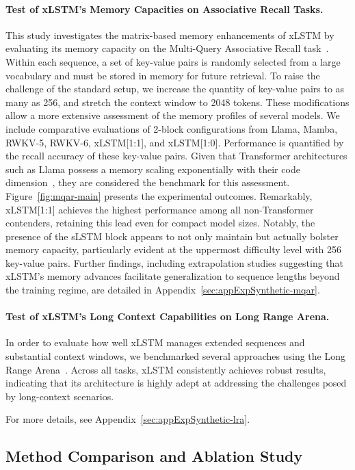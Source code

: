 \paragraph{Test of xLSTM's Memory Capacities on Associative Recall Tasks.} This study investigates the matrix-based memory enhancements of xLSTM by evaluating its memory capacity on the Multi-Query Associative Recall task~\citep{Arora:23arxiv}. Within each sequence, a set of key-value pairs is randomly selected from a large vocabulary and must be stored in memory for future retrieval. To raise the challenge of the standard setup, we increase the quantity of key-value pairs to as many as 256, and stretch the context window to 2048 tokens. These modifications allow a more extensive assessment of the memory profiles of several models. We include comparative evaluations of 2-block configurations from Llama, Mamba, RWKV-5, RWKV-6, xLSTM[1:1], and xLSTM[1:0]. Performance is quantified by the recall accuracy of these key-value pairs. Given that Transformer architectures such as Llama possess a memory scaling exponentially with their code dimension~\citep{Ramsauer:21}, they are considered the benchmark for this assessment. Figure~\ref{fig:mqar-main} presents the experimental outcomes. Remarkably, xLSTM[1:1] achieves the highest performance among all non-Transformer contenders, retaining this lead even for compact model sizes. Notably, the presence of the sLSTM block appears to not only maintain but actually bolster memory capacity, particularly evident at the uppermost difficulty level with 256 key-value pairs. Further findings, including extrapolation studies suggesting that xLSTM's memory advances facilitate generalization to sequence lengths beyond the training regime, are detailed in Appendix~\ref{sec:appExpSynthetic-mqar}.

\paragraph{Test of xLSTM's Long Context Capabilities on Long Range Arena.} In order to evaluate how well xLSTM manages extended sequences and substantial context windows, we benchmarked several approaches using the Long Range Arena~\citep{Tay:21}. Across all tasks, xLSTM consistently achieves robust results, indicating that its architecture is highly adept at addressing the challenges posed by long-context scenarios.

For more details, see Appendix~\ref{sec:appExpSynthetic-lra}.

\subsection{Method Comparison and Ablation Study}
\label{sec:ExpComparison}

